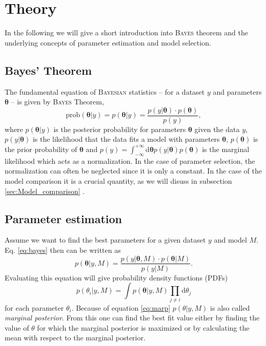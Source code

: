 \documentclass[%
 reprint,
 amsmath,amssymb,
 aps,
]{revtex4-1}
\begin{document}
\section{Theory}
\noindent In the following we will give a short introduction into \textsc{Bayes} theorem and the underlying concepts of parameter estimation and model selection.
\subsection{Bayes' Theorem}
\noindent The fundamental equation of \textsc{Bayesian} statistics -- for a dataset $y$ and parameters $\boldsymbol{\theta}$ -- is given by \textsc{Bayes} Theorem,
\begin{equation}
\label{eq:bayes}
\text{prob}(\boldsymbol{\theta} | y) =	p(\boldsymbol{\theta} | y) = \frac{p(y|\boldsymbol{\theta})\cdot p(\boldsymbol{\theta})}{p(y)},
\end{equation}
where $p(\boldsymbol{\theta} | y) $ is the posterior probability for parameters $\boldsymbol{\theta}$ given the data $y$, $p(y|\boldsymbol{\theta})$ is the likelihood that the data fits a model with parameters $\boldsymbol{\theta}$, $p(\boldsymbol{\theta})$ is the prior probability of $\boldsymbol{\theta}$ and $p(y)= \int_{-\infty}^{+\infty}\text{d}\boldsymbol{\theta} p(y|\boldsymbol{\theta})p(\boldsymbol{\theta})$ is the marginal likelihood which acts as a normalization.  In the case of parameter selection, the normalization can often be neglected since it is only a  constant. In the case of the model comparison it is a crucial quantity, as we will disuss in subsection \eqref{sec:Model_comparison} \cite[Chap. 2]{sivia}. 

\subsection{Parameter estimation}
\noindent Assume we want to find the best parameters for a given dataset $y$ and model $M$. Eq. \eqref{eq:bayes} then can be written as
\begin{equation}\label{eq:PDF}
	p(\boldsymbol{\theta} | y,M) = \frac{p(y|\boldsymbol{\theta},M)\cdot p(\boldsymbol{\theta}|M)}{p(y|M)}.
\end{equation}
Evaluating this equation will give probability density functions (PDFs) 
\begin{equation}
\label{eq:marp}
	p(\theta_i|y,M)=\int p(\boldsymbol{\theta}|y,M)\prod_{j\neq i}\text{d}{\theta_j}
\end{equation}
 for each parameter $\theta_i$.  Because of equation \eqref{eq:marp} $p(\theta|y,M)$ is also called \emph{marginal posterior}. From this one can find the best fit value either by finding the value of $\theta$ for which the marginal posterior is maximized or by calculating the mean with respect to the marginal posterior.
\end{document}
